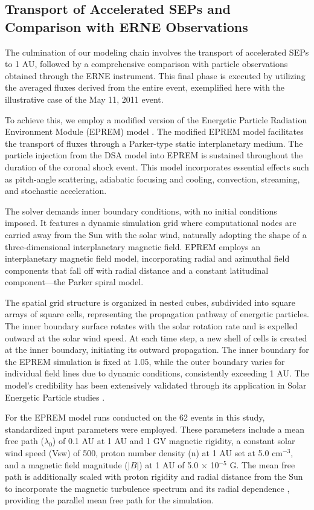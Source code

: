 \subsection{Transport of Accelerated SEPs and Comparison with ERNE Observations}
The culmination of our modeling chain involves the transport of accelerated SEPs to 1 AU, followed by a comprehensive comparison with particle observations obtained through the ERNE instrument. This final phase is executed by utilizing the averaged fluxes derived from the entire event, exemplified here with the illustrative case of the May 11, 2011 event.

To achieve this, we employ a modified version of the Energetic Particle Radiation Environment Module (EPREM) model \citep{schwadron_2010}. The modified EPREM model facilitates the transport of fluxes through a Parker-type static interplanetary medium. The particle injection from the DSA model into EPREM is sustained throughout the duration of the coronal shock event. This model incorporates essential effects such as pitch-angle scattering, adiabatic focusing and cooling, convection, streaming, and stochastic acceleration.

The solver demands inner boundary conditions, with no initial conditions imposed. It features a dynamic simulation grid where computational nodes are carried away from the Sun with the solar wind, naturally adopting the shape of a three-dimensional interplanetary magnetic field. EPREM employs an interplanetary magnetic field model, incorporating radial and azimuthal field components that fall off with radial distance and a constant latitudinal component—the Parker spiral model.

The spatial grid structure is organized in nested cubes, subdivided into square arrays of square cells, representing the propagation pathway of energetic particles. The inner boundary surface rotates with the solar rotation rate and is expelled outward at the solar wind speed. At each time step, a new shell of cells is created at the inner boundary, initiating its outward propagation. The inner boundary for the EPREM simulation is fixed at 1.05\rsun, while the outer boundary varies for individual field lines due to dynamic conditions, consistently exceeding 1 AU. The model's credibility has been extensively validated through its application in Solar Energetic Particle studies \citep{kozarev_2010, schwadron_2014}.

For the EPREM model runs conducted on the 62 events in this study, standardized input parameters were employed. These parameters include a mean free path ($\lambda_0$) of 0.1 AU at 1 AU and 1 GV magnetic rigidity, a constant solar wind speed (Vsw) of 500\kms, proton number density (n) at 1 AU set at 5.0 cm$^{-3}$, and a magnetic field magnitude ($|B|$) at 1 AU of 5.0 $\times$ 10$^{-5}$ G. The mean free path is additionally scaled with proton rigidity and radial distance from the Sun to incorporate the magnetic turbulence spectrum and its radial dependence \citep{zank_1998, li_2003, sokolov_2004, verkhoglyadova_2009}, providing the parallel mean free path for the simulation.

